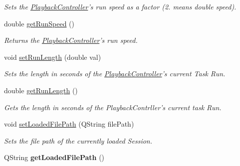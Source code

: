 \begin{DoxyCompactItemize}
\begin{DoxyCompactList}\small\item\em Sets the \hyperlink{class_playback_controller}{Playback\-Controller}'s run speed as a factor (2. means double speed). \end{DoxyCompactList}\item 
double \hyperlink{class_playback_controller_data_aac6a2c8c7689426fe0e0dc46ec7e8320}{get\-Run\-Speed} ()
\begin{DoxyCompactList}\small\item\em Returns the \hyperlink{class_playback_controller}{Playback\-Controller}'s run speed. \end{DoxyCompactList}\item 
\hypertarget{class_playback_controller_data_a32caaf1be21488bd46734ec39e54ea91}{void \hyperlink{class_playback_controller_data_a32caaf1be21488bd46734ec39e54ea91}{set\-Run\-Length} (double val)}\label{class_playback_controller_data_a32caaf1be21488bd46734ec39e54ea91}

\begin{DoxyCompactList}\small\item\em Sets the length in seconds of the \hyperlink{class_playback_controller}{Playback\-Controller}'s current Task Run. \end{DoxyCompactList}\item 
\hypertarget{class_playback_controller_data_a068e6ea0ab384ff27456105041faf94b}{double \hyperlink{class_playback_controller_data_a068e6ea0ab384ff27456105041faf94b}{get\-Run\-Length} ()}\label{class_playback_controller_data_a068e6ea0ab384ff27456105041faf94b}

\begin{DoxyCompactList}\small\item\em Gets the length in seconds of the Playback\-Contrller's current task Run. \end{DoxyCompactList}\item 
\hypertarget{class_playback_controller_data_af1121dd5f1011727b9c26c5e3c5ee9d7}{void \hyperlink{class_playback_controller_data_af1121dd5f1011727b9c26c5e3c5ee9d7}{set\-Loaded\-File\-Path} (Q\-String file\-Path)}\label{class_playback_controller_data_af1121dd5f1011727b9c26c5e3c5ee9d7}

\begin{DoxyCompactList}\small\item\em Sets the file path of the currently loaded Session. \end{DoxyCompactList}\item 
\hypertarget{class_playback_controller_data_a5aed80565708c1a645d030dd00ce292c}{Q\-String {\bfseries get\-Loaded\-File\-Path} ()}\label{class_playback_controller_data_a5aed80565708c1a645d030dd00ce292c}


\end{DoxyCompactItemize}
